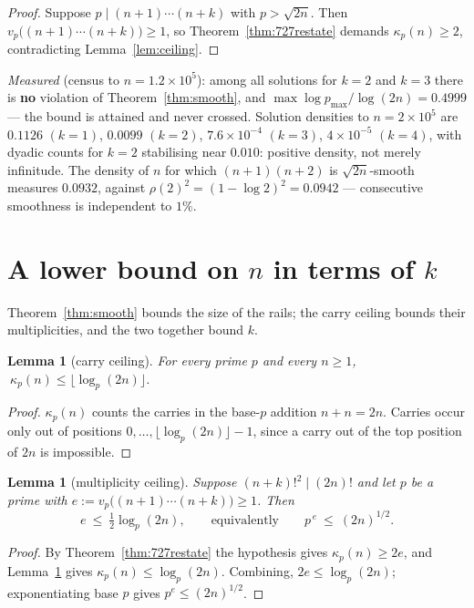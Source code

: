 \documentclass[11pt]{article}
\newtheorem{lemma}[theorem]{Lemma}
\begin{document}
\begin{proof}
Suppose $p\mid(n{+}1)\cdots(n{+}k)$ with $p>\sqrt{2n}$.  Then
$v_p\bigl((n{+}1)\cdots(n{+}k)\bigr)\ge1$, so Theorem~\ref{thm:727restate} demands
$\kappa_p(n)\ge2$, contradicting Lemma~\ref{lem:ceiling}.
\end{proof}

\emph{Measured} (census to $n=1.2\times10^5$): among all solutions for $k=2$ and $k=3$
there is \textbf{no} violation of Theorem~\ref{thm:smooth}, and
$\max\log p_{\max}/\log(2n)=0.4999$ --- the bound is attained and never crossed.  Solution
densities to $n=2\times10^5$ are $0.1126$ $(k{=}1)$, $0.0099$ $(k{=}2)$, $7.6\times10^{-4}$
$(k{=}3)$, $4\times10^{-5}$ $(k{=}4)$, with dyadic counts for $k=2$ stabilising near
$0.010$: positive density, not merely infinitude.  The density of $n$ for which
$(n{+}1)(n{+}2)$ is $\sqrt{2n}$-smooth measures $0.0932$, against
$\rho(2)^2=(1-\log2)^2=0.0942$ --- consecutive smoothness is independent to $1\%$.

\section{A lower bound on $n$ in terms of $k$}

Theorem~\ref{thm:smooth} bounds the size of the rails; the carry ceiling bounds their
multiplicities, and the two together bound $k$.

\begin{lemma}[carry ceiling]\label{lem:carryceil}
For every prime $p$ and every $n\ge1$, $\ \kappa_p(n)\le\lfloor\log_p(2n)\rfloor$.
\end{lemma}

\begin{proof}
$\kappa_p(n)$ counts the carries in the base-$p$ addition $n+n=2n$.  Carries occur only out
of positions $0,\dots,\lfloor\log_p(2n)\rfloor-1$, since a carry out of the top position of
$2n$ is impossible.
\end{proof}

\begin{lemma}[multiplicity ceiling]\label{lem:multceil}
Suppose $(n+k)!^{2}\mid(2n)!$ and let $p$ be a prime with
$e:=v_p\bigl((n{+}1)\cdots(n{+}k)\bigr)\ge1$.  Then
\[
  e\ \le\ \tfrac12\log_p(2n),
  \qquad\text{equivalently}\qquad p^{\,e}\ \le\ (2n)^{1/2}.
\]
\end{lemma}

\begin{proof}
By Theorem~\ref{thm:727restate} the hypothesis gives $\kappa_p(n)\ge2e$, and
Lemma~\ref{lem:carryceil} gives $\kappa_p(n)\le\log_p(2n)$.  Combining,
$2e\le\log_p(2n)$; exponentiating base $p$ gives $p^{e}\le(2n)^{1/2}$.
\end{proof}
\end{document}
